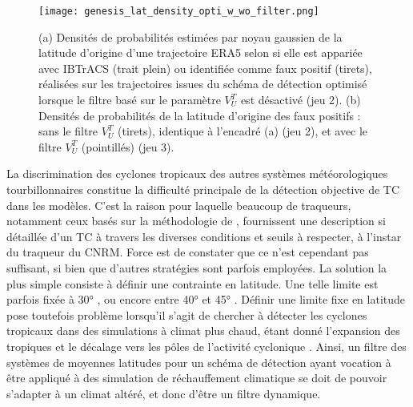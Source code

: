 \documentclass[../main.tex]{subfiles}
\begin{document}

\begin{figure}[tb]
    \centering
    \texttt{[image: genesis\_lat\_density\_opti\_w\_wo\_filter.png]}
    \caption{(a) Densités de probabilités estimées par noyau gaussien de la latitude d'origine d'une trajectoire ERA5 selon si elle est appariée avec IBTrACS
    (trait plein) ou identifiée comme faux positif (tirets), réalisées sur les trajectoires issues du schéma de détection optimisé lorsque le filtre basé sur
    le paramètre $V_U^T$ est désactivé (jeu 2). (b) Densités de probabilités de la latitude d'origine des faux positifs : sans le filtre $V_U^T$ (tirets),
    identique à l'encadré (a) (jeu 2), et avec le filtre $V_U^T$ (pointillés) (jeu 3).}
    \label{fig:lat_density}
\end{figure}

La discrimination des cyclones tropicaux des autres systèmes météorologiques tourbillonnaires constitue la difficulté principale de la détection objective de TC
dans les modèles. C'est la raison pour laquelle beaucoup de traqueurs, notamment ceux basés sur la méthodologie de \textcite{bengtsson_hurricanetype_1995},
fournissent une description si détaillée d'un TC à travers les diverses conditions et seuils à respecter, à l'instar du traqueur du CNRM. Force est de constater
que ce n'est cependant pas suffisant, si bien que d'autres stratégies sont parfois employées. La solution la plus simple consiste à définir une contrainte en
latitude. Une telle limite est parfois fixée à \ang{30} \parencite{bengtsson_simulation_1982,broccoli_can_1990,mcdonald_tropical_2005}, ou encore entre \ang{40}
et \ang{45} \parencite{wu_gcm_1992,tsutsui_simulated_1996,tsutsui_implications_2002,oouchi_tropical_2006,zarzycki_multidecadal_2014}. Définir une limite fixe en
latitude pose toutefois problème lorsqu'il s'agit de chercher à détecter les cyclones tropicaux dans des simulations à climat plus chaud, étant donné
l'expansion des tropiques \parencite{lucas_expanding_2014,staten_reexamining_2018} et le décalage vers les pôles de l'activité cyclonique
\parencite{kossin_poleward_2014,knutson_tropical_2020}. Ainsi, un filtre des systèmes de moyennes latitudes pour un schéma de détection ayant vocation à être
appliqué à des simulation de réchauffement climatique se doit de pouvoir s'adapter à un climat altéré, et donc d'être un filtre dynamique.
\end{document}
